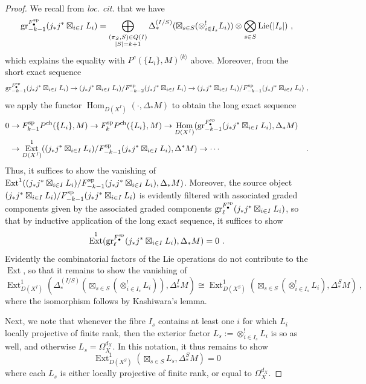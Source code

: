 \documentclass[11pt]{amsart}
\numberwithin{equation}{section}
\theoremstyle{definition}
\newcommand{\spe}{{\textup{sp}}}
\DeclareMathOperator{\Hom}{Hom}
\DeclareMathOperator{\Ext}{Ext}
\newcommand{\Lie}{{\textup{Lie}}}
\newcommand{\ch}{{\textup{ch}}}
\newcommand{\0}{{\textbf{0}}}
\newcommand{\DD}{{D}}
\newcommand{\gr}{\textup{gr}}
\def\ch{{\rm ch}}
\begin{document}
\begin{proof}
	We recall from \emph{loc. cit.} that we have
	\[\gr_{-k-1}^{F^\spe_\bullet}(j_*j^*\boxtimes_{i\in I} L_i)=\bigoplus_{\substack{(\pi_S,S)\in Q(I)\\ |S|=k+1}} \Delta^{(I/S)}_*( \boxtimes_{s\in S} (\otimes^!_{i\in I_s} L_i) )\otimes \bigotimes_{s\in S} \Lie(|I_s|)  \ , \]
	which explains the equality with $P^c(\{L_i\},M)^{\langle  k \rangle}$ above. Moreover, from the short exact sequence
	\[\gr_{-k-1}^{F^\spe_\bullet}(j_*j^*\boxtimes_{i\in I} L_i ) \to (j_*j^*\boxtimes_{i\in I} L_i)/ F^\spe_{-k-2}(j_*j^*\boxtimes_{i\in I} L_i) \to (j_*j^*\boxtimes_{i\in I} L_i)/ F^\spe_{-k-1}(j_*j^*\boxtimes_{i\in I} L_i)  \ ,\]
	we apply the functor $\Hom_{\DD(X^I)}(\cdot , \Delta_* M)$ to obtain the long exact sequence
	\begin{align*}
		0 & \to F_{k-1}^\spe P^\ch(\{L_i\},M) \to F_{k}^\spe P^\ch(\{L_i\},M) \to \Hom_{\DD(X^I)}(\gr_{-k-1}^{F^\spe_\bullet}(j_*j^*\boxtimes_{i\in I} L_i ), \Delta_*M) \\
		& \to \Ext^1_{\DD(X^I)}((j_*j^*\boxtimes_{i\in I} L_i)/ F^\spe_{-k-1}(j_*j^*\boxtimes_{i\in I} L_i) , \Delta^*M ) \to \cdots & .
	\end{align*}
	Thus, it suffices to show the vanishing of $\Ext^1((j_*j^*\boxtimes_{i\in I} L_i)/ F^\spe_{-k-1}(j_*j^*\boxtimes_{i\in I} L_i) , \Delta_*M )$. Moreover, the source object $(j_*j^*\boxtimes_{i\in I} L_i)/ F^\spe_{-k-1}(j_*j^*\boxtimes_{i\in I} L_i)$ is evidently filtered with associated graded components given by the associated graded components $\gr_{\ell}^{F^\spe_\bullet}(j_*j^*\boxtimes_{i\in I} L_i )$, so that by inductive application of the long exact sequence, it suffices to show
	\[ \Ext^1(\gr_{\ell}^{F^\spe_\bullet}(j_*j^*\boxtimes_{i\in I} L_i ),\Delta_*M) = 0  \ .\]
	Evidently the combinatorial factors of the Lie operations do not contribute to the $\Ext$, so that it remains to show the vanishing of
	\[ \Ext^1_{\DD(X^I)}(\Delta^{(I/S)}_*( \boxtimes_{s\in S} (\otimes^!_{i\in I_s} L_i) ),\Delta^I_*M) \cong \Ext^1_{\DD(X^S)}( \boxtimes_{s\in S} (\otimes^!_{i\in I_s} L_i), \Delta^S_*M) \ ,\]
	where the isomorphism follows by Kashiwara's lemma.
	
	Next, we note that whenever the fibre $I_s$ contains at least one $i$ for which $L_i$ locally projective of finite rank, then the exterior factor $L_s:=\otimes^!_{i\in I_s} L_i$ is so as well, and otherwise $L_s=\Omega_X^{d_X}$. In this notation, it thus remains to show
	\[  \Ext^1_{\DD(X^S)}( \boxtimes_{s\in S} L_s , \Delta^S_*M)=0 \]
	where each $L_s$ is either locally projective of finite rank, or equal to $\Omega_X^{d_X}$.
	

\end{proof}
\end{document}
